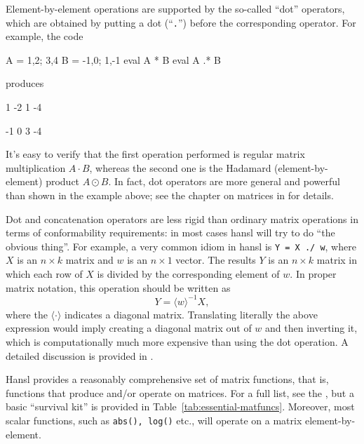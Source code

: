 Element-by-element operations are supported by the so-called ``dot''
operators, which are obtained by putting a dot (``\texttt{.}'') before
the corresponding operator. For example, the code
\begin{code}
A = {1,2; 3,4}
B = {-1,0; 1,-1}
eval A * B
eval A .* B
\end{code}
produces
\begin{code}
   1   -2 
   1   -4 

  -1    0 
   3   -4 
\end{code}

It's easy to verify that the first operation performed is regular
matrix multiplication $A \cdot B$, whereas the second one is the
Hadamard (element-by-element) product $A \odot B$. In fact, dot
operators are more general and powerful than shown in the example
above; see the chapter on matrices in \GUG{} for details.

Dot and concatenation operators are less rigid than ordinary matrix
operations in terms of conformability requirements: in most cases
hansl will try to do ``the obvious thing''. For example, a very common
idiom in hansl is \texttt{Y = X ./ w}, where $X$ is an $n \times k$
matrix and $w$ is an $n \times 1$ vector. The results $Y$ is an $n
\times k$ matrix in which each row of $X$ is divided by the
corresponding element of $w$. In proper matrix notation, this
operation should be written as
\[
  Y = \langle w \rangle^{-1} X,
\]
where the $\langle \cdot \rangle$ indicates a diagonal
matrix. Translating literally the above expression would imply
creating a diagonal matrix out of $w$ and then inverting it, which is
computationally much more expensive than using the dot operation. A
detailed discussion is provided in \GUG.

Hansl provides a reasonably comprehensive set of matrix functions,
that is, functions that produce and/or operate on matrices. For a
full list, see the \GCR, but a basic ``survival kit'' is provided
in Table~\ref{tab:essential-matfuncs}.  Moreover, most scalar
functions, such as \texttt{abs(), log()} etc., will operate on a
matrix element-by-element.

